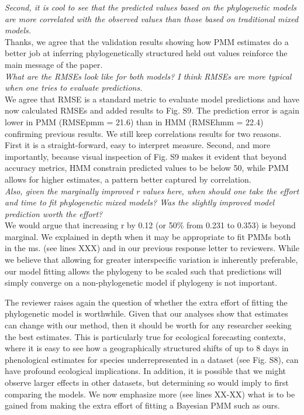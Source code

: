 \documentclass[11pt]{article}
\begin{document}
\emph{Second, it is cool to see that the predicted values based on the phylogenetic models are more correlated with the observed values than those based on traditional mixed models. }\\

Thanks, we agree that the validation results showing how PMM estimates do a better job at inferring phylogenetically structured held out values reinforce the main message of the paper.\\


\emph{What are the RMSEs look like for both models? I think RMSEs are more typical when one tries to evaluate predictions. }\\

We agree that RMSE is a standard metric to evaluate model predictions and have now calculated RMSEs and added results to Fig. S9. The prediction error is again lower in PMM (RMSEpmm = 21.6) than in HMM (RMSEhmm = 22.4) confirming previous results. We still keep correlations results for two reasons. First it is a straight-forward, easy to interpret measure. Second, and more importantly, because visual inspection of Fig. S9 makes it evident that beyond accuracy metrics, HMM constrain predicted values to be below 50, while PMM allows for higher estimates, a pattern better captured by correlation.\\

\emph{Also, given the marginally improved r values here, when should one take the effort and time to fit phylogenetic mixed models? Was the slightly improved model prediction worth the effort?}\\

We would argue that increasing r by 0.12 (or 50\% from 0.231 to 0.353) is beyond marginal. We explained in depth when it may be appropriate to fit PMMs both in the ms. (see lines XXX) and in our previous response letter to reviewers. While we believe that allowing for greater interspecific variation is inherently preferable, our model fitting allows the phylogeny to be scaled such that predictions will simply converge on a non-phylogenetic model if phylogeny is not important. 

The reviewer raises again the question of whether the extra effort of fitting the phylogenetic model is worthwhile. Given that our analyses show that estimates can change with our method, then it should be worth for any researcher seeking the best estimates. This is particularly true for ecological forecasting contexts, where it is easy to see how a geographically structured shifts of up to 8 days in phenological estimates for species underrepresented in a dataset (see Fig. S8), can have profound ecological implications. In addition, it is possible that we might observe larger effects in other datasets, but determining so would imply to first comparing the models. We now emphasize more (see lines XX-XX) what is to be gained from making the extra effort of fitting a Bayesian PMM such as ours.\\
\end{document}

